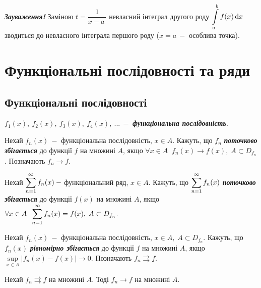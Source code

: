 \textcolor{NavyBlue}{\textbf{\textit{Зауваження!}}} Заміною $t=\dfrac{1}{x-a\:}$  невласний інтеграл другого роду $ \displaystyle\int\limits_a^b f(x) \, \mathrm{d}x \ $ зводиться до невласного інтеграла першого роду ($x = a \: -$ особлива точка).

\section{\Large{Функціональні послідовності та ряди}}

\subsection{\large{Функціональні послідовності}}
\begin{definition}
$f_1(x), \: f_2(x), \: f_3(x), \: f_4(x), \: ... \: - $  \textcolor{NavyBlue}{\textbf{\textit{функціональна послідовність}}}.
\end{definition}

\begin{definition}
Нехай $f_n(x) \: - $ функціональна послідовність, $x \in A.$
Кажуть, що $f_n $ \textcolor{NavyBlue}{\textbf{\textit{поточково збігається}}} до функції $f$ на множині $A$, якщо  $\forall x \in A \;\; f_n(x) \rightarrow f(x), \; A \subset D_{f_n} $. Позначають $f_n \rightarrow f$.
\end{definition}

\begin{definition}
Нехай $\displaystyle\sum\limits_{n=1}^{\infty} f_n(x) \: - $ функціональний ряд, $x \in A.$
Кажуть, що $\displaystyle\sum\limits_{n=1}^{\infty} f_n(x) $ \textcolor{NavyBlue}{\textbf{\textit{поточково збігається}}} до функції $f(x)$ на множині $A$, якщо  $\forall x \in A \;\;  \displaystyle\sum\limits_{n=1}^{\infty} f_n(x) = f(x), \; A \subset D_{f_n} $. 
\end{definition}

\begin{definition}
Нехай $f_n(x) \: - $ функціональна послідовність, $x \in A,\; A \subset D_{f_n} $. 
Кажуть, що $f_n(x) $ \textcolor{NavyBlue}{\textbf{\textit{рівномірно збігається}}} до функції $f$ на множині $A$, якщо  
$ \underset{x \in A}{\sup}|f_n(x) - f(x)| \rightarrow 0$. Позначають $f_n \rightrightarrows f$.
\end{definition}

\begin{theorem} 
Нехай $f_n \rightrightarrows f$ на множині $A$. Тоді $f_n \rightarrow f$ на множині $A$. 
\end{theorem} 

